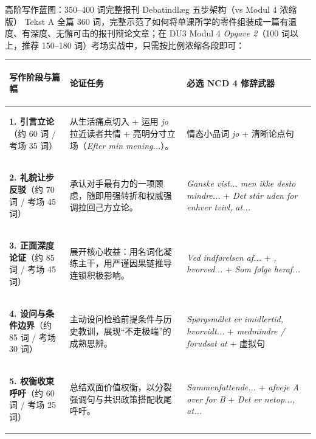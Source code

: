 \begin{grammatikbox}{高阶写作蓝图：350--400 词完整报刊 Debatindlæg 五步架构（vs Modul 4 浓缩版）}
Tekst A 全篇 360 词，完整示范了如何将单课所学的零件组装成一篇有温度、有深度、无懈可击的报刊辩论文章；在 DU3 Modul 4 \textit{Opgave 2}（100 词以上，推荐 150--180 词）考场实战中，只需按比例浓缩各段即可：

\vspace{0.3em}
\renewcommand{\arraystretch}{1.24}
{\small
\begin{tabularx}{\linewidth}{@{} >{\bfseries\raggedright\arraybackslash}p{2.9cm} >{\raggedright\arraybackslash}p{5.3cm} >{\raggedright\arraybackslash}X @{}}
\toprule
\textbf{写作阶段与篇幅} & \textbf{论证任务} & \textbf{必选 NCD 4 修辞武器} \\
\midrule
\textbf{1. 引言立论}\newline （约 60 词 / 考场 35 词） & 从生活痛点切入 + 运用 \textit{jo} 拉近读者共情 + 亮明分寸立场（\textit{Efter min mening...}）。 & 情态小品词 \textit{jo} + 清晰论点句 \\
\midrule
\textbf{2. 礼貌让步反驳}\newline （约 70 词 / 考场 45 词） & 承认对手最有力的一项顾虑，随即用强转折和权威强调拉回己方立论。 & \textit{Ganske vist... men ikke desto mindre...} + \textit{Det står uden for enhver tvivl, at...} \\
\midrule
\textbf{3. 正面深度论证}\newline （约 85 词 / 考场 45 词） & 展开核心收益：用名词化凝练主干，用严谨因果链推导连锁积极影响。 & \textit{Ved indførelsen af...} + \textit{, hvorved...} + \textit{Som følge heraf...} \\
\midrule
\textbf{4. 设问与条件边界}\newline （约 85 词 / 考场 30 词） & 主动设问检验前提条件与历史教训，展现“不走极端”的成熟思辨。 & \textit{Spørgsmålet er imidlertid, hvorvidt...} + \textit{medmindre / forudsat at} + 虚拟句 \\
\midrule
\textbf{5. 权衡收束呼吁}\newline （约 60 词 / 考场 25 词） & 总结双面价值权衡，以分裂强调句与共识政策搭配收尾呼吁。 & \textit{Sammenfattende...} + \textit{afveje A over for B} + \textit{Det er netop..., at...} \\
\bottomrule
\end{tabularx}
}
\end{grammatikbox}

